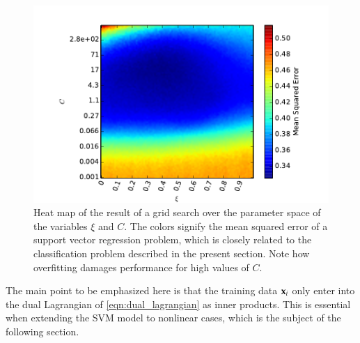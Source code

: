 \begin{figure}
	\centering
	\includegraphics[width = \figwidth]{pics/ml/grid_search_svr_e_logc.pdf}
	\caption{Heat map of the result of a grid search over the parameter space of the variables $\xi$ and $C$. The colors signify the mean squared error of a support vector regression problem, which is closely related to the classification problem described in the present section. Note how overfitting damages performance for high values of $C$.}
	\label{fig:grid_search_heatmap}
\end{figure}
The main point to be emphasized here is that the training data $\mathbf{x}_i$ only enter into the dual Lagrangian of \eqref{eqn:dual_lagrangian} as inner products. This is essential when extending the SVM model to nonlinear cases, which is the subject of the following section.

